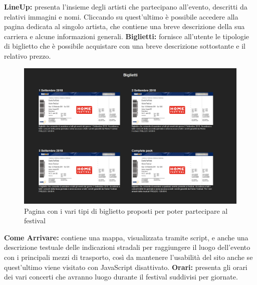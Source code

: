 \documentclass[10pt, a4paper]{article}
\begin{document}
\newline \textbf{LineUp: }presenta l'insieme degli artisti che partecipano all'evento, descritti da relativi immagini e nomi. Cliccando su quest'ultimo è possibile accedere alla pagina dedicata al singolo artista, che contiene una breve descrizione della sua carriera e alcune informazioni generali.
\newline \textbf{Biglietti: }fornisce all'utente le tipologie di biglietto che è possibile acquistare con una breve descrizione sottostante e il relativo prezzo.
\begin{figure}[h!]
  \centering
  \includegraphics[width=1\textwidth]{Images/biglietti.png}
  \caption{Pagina con i vari tipi di biglietto proposti per poter partecipare al festival}
  \label{fig:biglietti}
\end{figure}
\newline \textbf{Come Arrivare: }contiene una mappa, visualizzata tramite script, e anche una descrizione testuale delle indicazioni stradali per raggiungere il luogo dell'evento con i principali mezzi di trasporto, così da mantenere l'usabilità del sito anche se quest'ultimo viene visitato con JavaScript disattivato.
\newline \textbf{Orari: }presenta gli orari dei vari concerti che avranno luogo durante il festival suddivisi per giornate.
\end{document}
